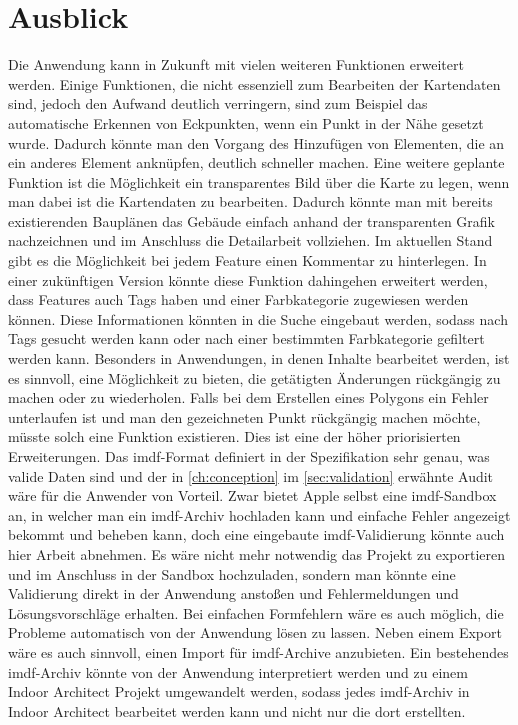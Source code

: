 \section{Ausblick}
Die Anwendung kann in Zukunft mit vielen weiteren Funktionen erweitert werden.
Einige Funktionen, die nicht essenziell zum Bearbeiten der Kartendaten sind, jedoch den Aufwand deutlich verringern, sind zum Beispiel das automatische Erkennen von Eckpunkten, wenn ein Punkt in der Nähe gesetzt wurde.
Dadurch könnte man den Vorgang des Hinzufügen von Elementen, die an ein anderes Element anknüpfen, deutlich schneller machen.\pbreak
%
Eine weitere geplante Funktion ist die Möglichkeit ein transparentes Bild über die Karte zu legen, wenn man dabei ist die Kartendaten zu bearbeiten.
Dadurch könnte man mit bereits existierenden Bauplänen das Gebäude einfach anhand der transparenten Grafik nachzeichnen und im Anschluss die Detailarbeit vollziehen.\pbreak%
%
Im aktuellen Stand gibt es die Möglichkeit bei jedem Feature einen Kommentar zu hinterlegen.
In einer zukünftigen Version könnte diese Funktion dahingehen erweitert werden, dass Features auch Tags haben und einer Farbkategorie zugewiesen werden können.
Diese Informationen könnten in die Suche eingebaut werden, sodass nach Tags gesucht werden kann oder nach einer bestimmten Farbkategorie gefiltert werden kann.\pbreak%
%
Besonders in Anwendungen, in denen Inhalte bearbeitet werden, ist es sinnvoll, eine Möglichkeit zu bieten, die getätigten Änderungen rückgängig zu machen oder zu wiederholen.
Falls bei dem Erstellen eines Polygons ein Fehler unterlaufen ist und man den gezeichneten Punkt rückgängig machen möchte, müsste solch eine Funktion existieren.
Dies ist eine der höher priorisierten Erweiterungen.\pbreak%
%
Das \ac{imdf}-Format definiert in der Spezifikation sehr genau, was valide Daten sind und der in \autoref{ch:conception} im \autoref{sec:validation} erwähnte Audit wäre für die Anwender von Vorteil.
Zwar bietet Apple selbst eine \ac{imdf}-Sandbox an, in welcher man ein \ac{imdf}-Archiv hochladen kann und einfache Fehler angezeigt bekommt und beheben kann, doch eine eingebaute \ac{imdf}-Validierung könnte auch hier Arbeit abnehmen.
Es wäre nicht mehr notwendig das Projekt zu exportieren und im Anschluss in der Sandbox hochzuladen, sondern man könnte eine Validierung direkt in der Anwendung anstoßen und Fehlermeldungen und Lösungsvorschläge erhalten.
Bei einfachen Formfehlern wäre es auch möglich, die Probleme automatisch von der Anwendung lösen zu lassen.\pbreak%
%
Neben einem Export wäre es auch sinnvoll, einen Import für \ac{imdf}-Archive anzubieten.
Ein bestehendes \ac{imdf}-Archiv könnte von der Anwendung interpretiert werden und zu einem Indoor Architect Projekt umgewandelt werden, sodass jedes \ac{imdf}-Archiv in Indoor Architect bearbeitet werden kann und nicht nur die dort erstellten.
